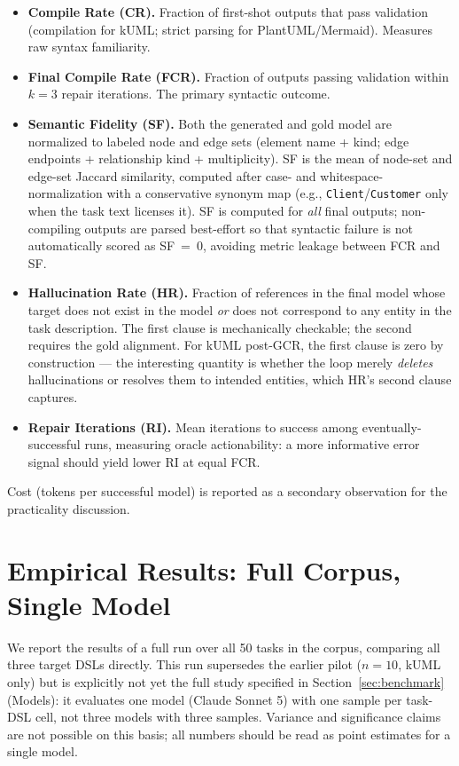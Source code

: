 \documentclass[acmsmall,nonacm]{acmart}
\begin{document}
\begin{itemize}
  \item \textbf{Compile Rate (CR).} Fraction of first-shot outputs that pass validation (compilation for kUML; strict parsing for PlantUML/Mermaid). Measures raw syntax familiarity.
  \item \textbf{Final Compile Rate (FCR).} Fraction of outputs passing validation within $k = 3$ repair iterations. The primary syntactic outcome.
  \item \textbf{Semantic Fidelity (SF).} Both the generated and gold model are normalized to labeled node and edge sets (element name + kind; edge endpoints + relationship kind + multiplicity). SF is the mean of node-set and edge-set Jaccard similarity, computed after case- and whitespace-normalization with a conservative synonym map (e.g., \texttt{Client}/\texttt{Customer} only when the task text licenses it). SF is computed for \emph{all} final outputs; non-compiling outputs are parsed best-effort so that syntactic failure is not automatically scored as SF~=~0, avoiding metric leakage between FCR and SF.
  \item \textbf{Hallucination Rate (HR).} Fraction of references in the final model whose target does not exist in the model \emph{or} does not correspond to any entity in the task description. The first clause is mechanically checkable; the second requires the gold alignment. For kUML post-GCR, the first clause is zero by construction --- the interesting quantity is whether the loop merely \emph{deletes} hallucinations or resolves them to intended entities, which HR's second clause captures.
  \item \textbf{Repair Iterations (RI).} Mean iterations to success among eventually-successful runs, measuring oracle actionability: a more informative error signal should yield lower RI at equal FCR.
\end{itemize}

Cost (tokens per successful model) is reported as a secondary observation for the practicality discussion.

\section{Empirical Results: Full Corpus, Single Model}
\label{sec:results}

We report the results of a full run over all 50 tasks in the corpus, comparing all three target DSLs directly. This run supersedes the earlier pilot ($n = 10$, kUML only) but is explicitly not yet the full study specified in Section~\ref{sec:benchmark} (Models): it evaluates one model (Claude Sonnet 5) with one sample per task-DSL cell, not three models with three samples. Variance and significance claims are not possible on this basis; all numbers should be read as point estimates for a single model.
\end{document}
